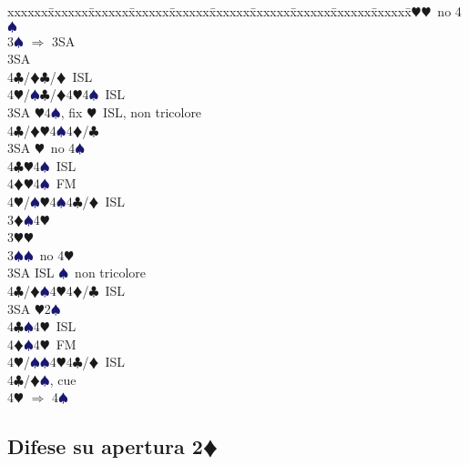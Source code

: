 \documentclass[a4paper,italian]{article}
\newcommand{\BC}{\textcolor{OliveGreen}{$\clubsuit$}}
\newcommand{\BD}{\textcolor{RedOrange}{$\vardiamondsuit$}}
\newcommand{\BH}{\textcolor{Red2}{$\varheartsuit${}}}
\newcommand{\BS}{\textcolor{MidnightBlue}{$\spadesuit${}}}
\newcommand{\pdfd}{\texorpdfstring{\BD{}}{D}}
\newenvironment{bidtable}
{\begin{tabbing}

    xxxxxx\=xxxxxx\=xxxxxx\=xxxxxx\=xxxxxx\=xxxxxx\=xxxxxx\=xxxxxx\=xxxxxx\=xxxxxx\=\kill}
{\end{tabbing} }%
\begin{document}
\begin{multicols}{2}
\begin{bidtable}
        3\BH {}\BH\ no 4\BS \+\\
        3\BS \> $\Rightarrow$ 3SA\+\\
        3SA\+\\
        4\BC/\BD {}\BC /\BD\ ISL\\
        4\BH/\BS {}\BC /\BD 4\BH 4\BS\ ISL\-\-\\
        3SA \BH 4\BS , fix \BH\ ISL, non tricolore\\
        4\BC/\BD {}\BH 4\BS 4\BD /\BC \-\\
        3SA \BH\ no 4\BS \+\\
        4\BC {}\BH 4\BS\ ISL\\
        4\BD {}\BH 4\BS\ FM\\
        4\BH/\BS {}\BH4\BS4\BC/\BD\ ISL\-\-\\
        3\BD {}\BS 4\BH \+\\
        3\BH {}\BH \\
        3\BS {}\BS\ no 4\BH \+\\
        3SA\> ISL \BS\ non tricolore\\
        4\BC/\BD {}\BS 4\BH 4\BD /\BC\ ISL\-\\
        3SA \BH 2\BS \+\\
        4\BC {}\BS 4\BH\ ISL\\
        4\BD {}\BS 4\BH\ FM\\
        4\BH/\BS {}\BS 4\BH 4\BC /\BD\ ISL \-\\
        4\BC/\BD {}\BS, cue\+\\
        4\BH \> $\Rightarrow$ 4\BS

    \end{bidtable}
\end{multicols}

\subsection{Difese su apertura 2\pdfd}
\end{document}

